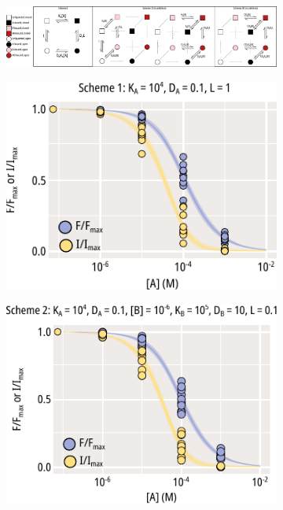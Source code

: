 \begin{figure}[h]
	\centering
	\begin{subfigure}[t]{0.9\textwidth}
		\caption{}\label{ch4fig:mwc_model_diagrams}
		\centering
		\includegraphics[width=\textwidth]{mwc_model_diagrams.pdf}
	\end{subfigure}
	\vfill
	\begin{subfigure}[t]{0.3\textwidth}
		\caption{}\label{ch4fig:mwc_scheme_1_fits}
		\centering
		\includegraphics[width=\textwidth]{mwc_scheme_1_fits.pdf}
	\end{subfigure}
	\hfill
	\begin{subfigure}[t]{0.3\textwidth}
		\caption{}\label{ch4fig:mwc_scheme_2_fits}
		\centering
		\includegraphics[width=\textwidth]{mwc_scheme_2_fits.pdf}

\end{subfigure}
\end{figure}
